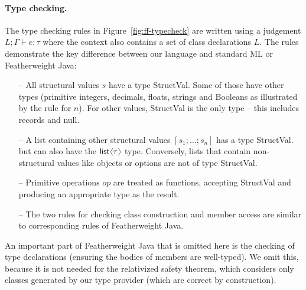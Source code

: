 \documentclass[preprint]{sigplanconf}
\newcommand{\langl}{\begin{picture}(4.5,7)
\put(1.1,2.5){\rotatebox{60}{\line(1,0){5.5}}}
\put(1.1,2.5){\rotatebox{300}{\line(1,0){5.5}}}
\end{picture}}
\newcommand{\rangl}{\begin{picture}(4.5,7)
\put(.9,2.5){\rotatebox{120}{\line(1,0){5.5}}}
\put(.9,2.5){\rotatebox{240}{\line(1,0){5.5}}}
\end{picture}}
\newcommand{\kvd}[1]{\textnormal{\textcolor{kvdclr}{\sffamily #1}}}
\newcommand{\ident}[1]{\textnormal{\sffamily #1}}
\begin{document}
\paragraph{Type checking.} 
The type checking rules in Figure~\ref{fig:ff-typecheck} are written using a judgement
$L; \Gamma \vdash e : \tau$ where the context also contains a set of class declarations $L$.
The rules demonstrate the key difference between our language and standard ML or Featherweight Java:
%
\begin{itemize}[noitemsep]
\item[--] All structural values $s$ have a type \ident{StructVal}. Some of those have other types
  (primitive integers, decimals, floats, strings and Booleans as illustrated by the rule for $n$).
  For other values, \ident{StructVal} is the only type -- this includes records and \kvd{null}.
\item[--] A list containing other structural values $[s_1; \ldots; s_n]$ has a type \ident{StructVal}.  
  but can also have the $\ident{list}\langl\tau\rangl$ type. Conversely, lists that contain
  non-structural values like objects or options are not of type \ident{StructVal}.
\item[--] Primitive operations $op$ are treated as functions, accepting \ident{StructVal} and producing
  an appropriate type as the result.
\item[--] The two rules for checking class construction and member access are similar to corresponding
  rules of Featherweight Java.  
\end{itemize}
%
An important part of Featherweight Java that is omitted here is the checking of type declarations
(ensuring the bodies of members are well-typed). We omit this, because it is not needed for the
relativized safety theorem, which considers only classes generated by our type provider (which 
are correct by construction).

\end{document}
